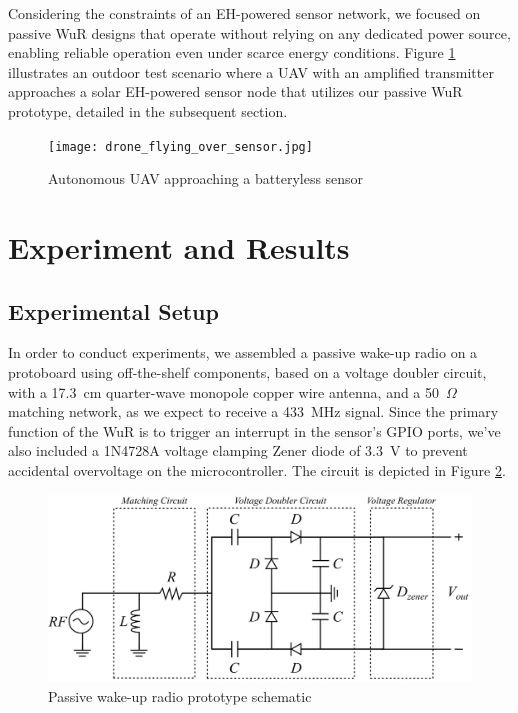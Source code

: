 \documentclass[conference]{IEEEtran}
\begin{document}
Considering the constraints of an EH-powered sensor network, we focused on passive WuR designs that operate without relying on any dedicated power source, enabling reliable operation even under scarce energy conditions. Figure \ref{fig:drone_over_sensor} illustrates an outdoor test scenario where a UAV with an amplified transmitter approaches a solar EH-powered sensor node that utilizes our passive WuR prototype, detailed in the subsequent section.

\begin{figure}[htbp]
  \centerline{\texttt{[image: drone\_flying\_over\_sensor.jpg]}}
  \caption{Autonomous UAV approaching a batteryless sensor}
  \label{fig:drone_over_sensor}
\end{figure}

\section{Experiment and Results}

\subsection{Experimental Setup}

In order to conduct experiments, we assembled a passive wake-up radio on a protoboard using off-the-shelf components, based on a voltage doubler circuit, with a 17.3~cm quarter-wave monopole copper wire antenna, and a 50~$\Omega$ matching network, as we expect to receive a 433~MHz signal. Since the primary function of the WuR is to trigger an interrupt in the sensor's GPIO ports, we've also included a 1N4728A voltage clamping Zener diode of 3.3~V to prevent accidental overvoltage on the microcontroller. The circuit is depicted in Figure \ref{fig:receiver}.

\begin{figure}[htbp]
  \centerline{\includegraphics[width=1\linewidth]{receiver.png}}
  \caption{Passive wake-up radio prototype schematic}
  \label{fig:receiver}
\end{figure}
\end{document}
